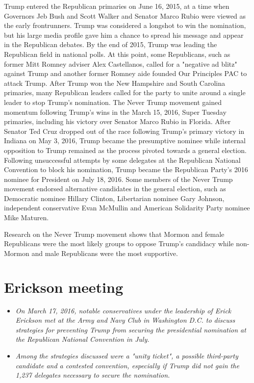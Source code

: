Trump entered the Republican primaries on June 16, 2015, at a time when
Governors Jeb Bush and Scott Walker and Senator Marco Rubio were viewed
as the early frontrunners. Trump was considered a longshot to win the
nomination, but his large media profile gave him a chance to spread his
message and appear in the Republican debates. By the end of 2015, Trump
was leading the Republican field in national polls. At this point, some
Republicans, such as former Mitt Romney adviser Alex Castellanos, called
for a "negative ad blitz" against Trump and another former Romney aide
founded Our Principles PAC to attack Trump. After Trump won the New
Hampshire and South Carolina primaries, many Republican leaders called
for the party to unite around a single leader to stop Trump's
nomination. The Never Trump movement gained momentum following Trump's
wins in the March 15, 2016, Super Tuesday primaries, including his
victory over Senator Marco Rubio in Florida. After Senator Ted Cruz
dropped out of the race following Trump's primary victory in Indiana on
May 3, 2016, Trump became the presumptive nominee while internal
opposition to Trump remained as the process pivoted towards a general
election. Following unsuccessful attempts by some delegates at the
Republican National Convention to block his nomination, Trump became the
Republican Party's 2016 nominee for President on July 18, 2016. Some
members of the Never Trump movement endorsed alternative candidates in
the general election, such as Democratic nominee Hillary Clinton,
Libertarian nominee Gary Johnson, independent conservative Evan McMullin
and American Solidarity Party nominee Mike Maturen.

Research on the Never Trump movement shows that Mormon and female
Republicans were the most likely groups to oppose Trump's candidacy
while non-Mormon and male Republicans were the most supportive.

\section{Erickson meeting}\label{erickson-meeting}

\begin{itemize}
\item
  \emph{On March 17, 2016, notable conservatives under the leadership of
  Erick Erickson met at the Army and Navy Club in Washington D.C. to
  discuss strategies for preventing Trump from securing the presidential
  nomination at the Republican National Convention in July.}
\item
  \emph{Among the strategies discussed were a "unity ticket", a possible
  third-party candidate and a contested convention, especially if Trump
  did not gain the 1,237 delegates necessary to secure the nomination.}
\end{itemize}

